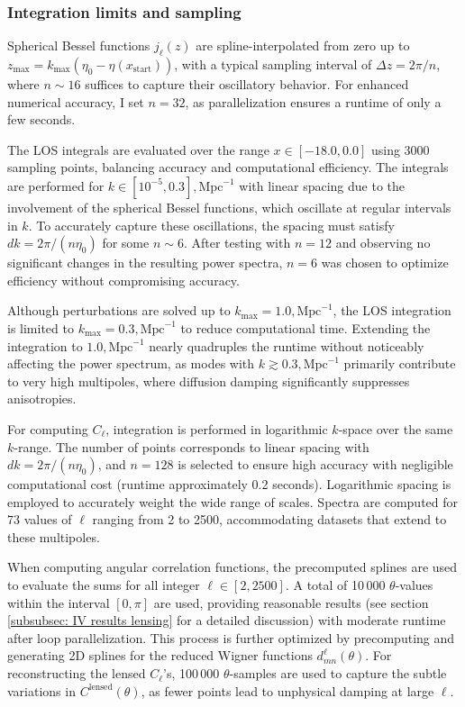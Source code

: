 \documentclass{aa}
\numberwithin{equation}{section}
\numberwithin{table}{section}
\numberwithin{figure}{section}
\begin{document}
\subsubsection{Integration limits and sampling}\label{subsec: IV methods sampling}
Spherical Bessel functions $j_\ell(z)$ are spline-interpolated from zero up to $z_{\text{max}} = k_{\text{max}}(\eta_0 - \eta(x_{\text{start}}))$, with a typical sampling interval of $\Delta z = 2\pi/n$, where $n \sim 16$ suffices to capture their oscillatory behavior. For enhanced numerical accuracy, I set $n = 32$, as parallelization ensures a runtime of only a few seconds.

The LOS integrals are evaluated over the range $x \in [-18.0, 0.0]$ using 3000 sampling points, balancing accuracy and computational efficiency. The integrals are performed for $k \in [10^{-5}, 0.3],\text{Mpc}^{-1}$ with linear spacing due to the involvement of the spherical Bessel functions, which oscillate at regular intervals in $k$. To accurately capture these oscillations, the spacing must satisfy $dk = 2\pi/(n\eta_0)$ for some $n \sim 6$. After testing with $n=12$ and observing no significant changes in the resulting power spectra, $n=6$ was chosen to optimize efficiency without compromising accuracy.

Although perturbations are solved up to $k_{\text{max}} = 1.0,\text{Mpc}^{-1}$, the LOS integration is limited to $k_{\text{max}} = 0.3,\text{Mpc}^{-1}$ to reduce computational time. Extending the integration to $1.0,\text{Mpc}^{-1}$ nearly quadruples the runtime without noticeably affecting the power spectrum, as modes with $k \gtrsim 0.3,\text{Mpc}^{-1}$ primarily contribute to very high multipoles, where diffusion damping significantly suppresses anisotropies.

For computing $C_\ell$, integration is performed in logarithmic $k$-space over the same $k$-range. The number of points corresponds to linear spacing with $dk = 2\pi/(n\eta_0)$, and $n=128$ is selected to ensure high accuracy with negligible computational cost (runtime approximately 0.2 seconds). Logarithmic spacing is employed to accurately weight the wide range of scales. Spectra are computed for 73 values of $\ell$ ranging from 2 to 2500, accommodating datasets that extend to these multipoles.

When computing angular correlation functions, the precomputed splines are used to evaluate the sums for all integer $\ell \in [2, 2500]$. A total of 10$\,$000 $\theta$-values within the interval $[0, \pi]$ are used, providing reasonable results (see section \ref{subsubsec: IV results lensing} for a detailed discussion) with moderate runtime after loop parallelization. This process is further optimized by precomputing and generating 2D splines for the reduced Wigner functions $d^\ell_{mn}(\theta)$. For reconstructing the lensed $C_\ell$'s, 100$\,$000 $\theta$-samples are used to capture the subtle variations in $C^{\text{lensed}}(\theta)$, as fewer points lead to unphysical damping at large $\ell$.
\end{document}
